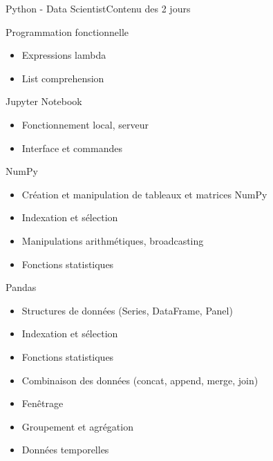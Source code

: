 \documentclass{beamer}
\begin{document}
    \begin{frame}{Python - Data Scientist}{Contenu des 2 jours}
        \begin{tiny}
            \begin{multicols}{3}
                \begin{itemize}
                {\tiny
                \item Programmation fonctionnelle
                    \begin{itemize}
                        \tiny
                        \item Expressions lambda
                        \item List comprehension
                    \end{itemize}

                    \item Jupyter Notebook
                    \begin{itemize}
                        \tiny
                        \item Fonctionnement local, serveur
                        \item Interface et commandes
                    \end{itemize}

                    \item NumPy
                    \begin{itemize}
                        \tiny
                        \item Création et manipulation de tableaux et matrices NumPy
                        \item Indexation et sélection
                        \item Manipulations arithmétiques, broadcasting
                        \item Fonctions statistiques
                    \end{itemize}

                    \item Pandas
                    \begin{itemize}
                        \tiny
                        \item Structures de données (Series, DataFrame, Panel)
                        \item Indexation et sélection
                        \item Fonctions statistiques
                        \item Combinaison des données (concat, append, merge, join)
                        \item Fenêtrage
                        \item Groupement et agrégation
                        \item Données temporelles
                    \end{itemize}

}
\end{itemize}
\end{multicols}
\end{tiny}
\end{frame}
\end{document}
